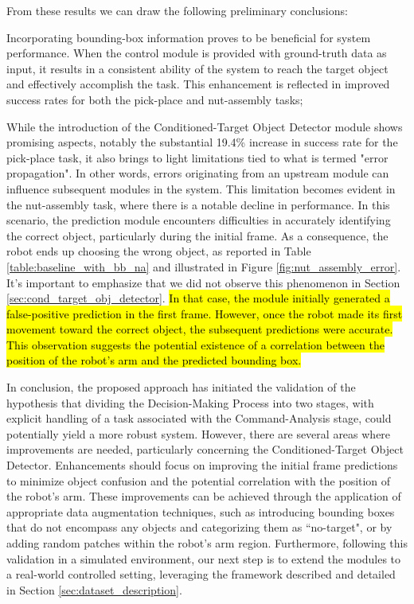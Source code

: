 From these results we can draw the following preliminary conclusions: \begin{enumerate*}[label=(\arabic*)]
    \item Incorporating bounding-box information proves to be beneficial for system performance. When the control module is provided with ground-truth data as input, it results in a consistent ability of the system to reach the target object and effectively accomplish the task. This enhancement is reflected in improved success rates for both the pick-place and nut-assembly tasks;
    \item While the introduction of the Conditioned-Target Object Detector module shows promising aspects, notably the substantial 19.4\% increase in success rate for the pick-place task, it also brings to light limitations tied to what is termed "error propagation". In other words, errors originating from an upstream module can influence subsequent modules in the system. This limitation becomes evident in the nut-assembly task, where there is a notable decline in performance. In this scenario, the prediction module encounters difficulties in accurately identifying the correct object, particularly during the initial frame. As a consequence, the robot ends up choosing the wrong object, as reported in Table \ref{table:baseline_with_bb_na} and illustrated in Figure \ref{fig:nut_assembly_error}. It's important to emphasize that we did not observe this phenomenon in Section \ref{sec:cond_target_obj_detector}. \hl{In that case, the module initially generated a false-positive prediction in the first frame. However, once the robot made its first movement toward the correct object, the subsequent predictions were accurate. This observation suggests the potential existence of a correlation between the position of the robot's arm and the predicted bounding box.}
\end{enumerate*}



In conclusion, the proposed approach has initiated the validation of the hypothesis that dividing the Decision-Making Process into two stages, with explicit handling of a task associated with the Command-Analysis stage, could potentially yield a more robust system. However, there are several areas where improvements are needed, particularly concerning the Conditioned-Target Object Detector. Enhancements should focus on improving the initial frame predictions to minimize object confusion and the potential correlation with the position of the robot's arm. These improvements can be achieved through the application of appropriate data augmentation techniques, such as introducing bounding boxes that do not encompass any objects and categorizing them as ``no-target", or by adding random patches within the robot's arm region. Furthermore, following this validation in a simulated environment, our next step is to extend the modules to a real-world controlled setting, leveraging the framework described and detailed in Section \ref{sec:dataset_description}.